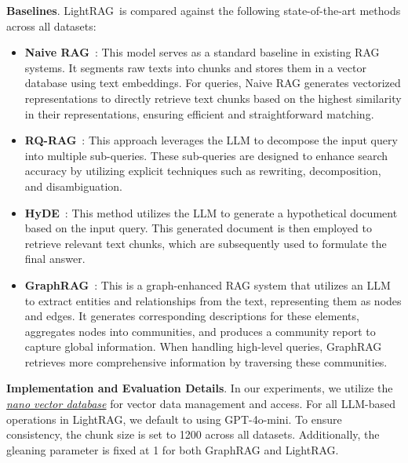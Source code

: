 \documentclass{article} %
\def\model{LightRAG}
\begin{document}
\textbf{Baselines}.  \model\ is compared against the following state-of-the-art methods across all datasets:
\begin{itemize}[leftmargin=*]
    \item \textbf{Naive RAG}~\citep{gao2023retrieval}: This model serves as a standard baseline in existing RAG systems. It segments raw texts into chunks and stores them in a vector database using text embeddings. For queries, Naive RAG generates vectorized representations to directly retrieve text chunks based on the highest similarity in their representations, ensuring efficient and straightforward matching.
    
    \item \textbf{RQ-RAG}~\citep{chan2024rq}: This approach leverages the LLM to decompose the input query into multiple sub-queries. These sub-queries are designed to enhance search accuracy by utilizing explicit techniques such as rewriting, decomposition, and disambiguation.
    
    \item \textbf{HyDE}~\citep{hyde}: This method utilizes the LLM to generate a hypothetical document based on the input query. This generated document is then employed to retrieve relevant text chunks, which are subsequently used to formulate the final answer.
    
    \item \textbf{GraphRAG}~\citep{edge2024local}: This is a graph-enhanced RAG system that utilizes an LLM to extract entities and relationships from the text, representing them as nodes and edges. It generates corresponding descriptions for these elements, aggregates nodes into communities, and produces a community report to capture global information. When handling high-level queries, GraphRAG retrieves more comprehensive information by traversing these communities.
\end{itemize}

\textbf{Implementation and Evaluation Details}.
In our experiments, we utilize the \href{https://github.com/gusye1234/nano-vectordb}{\textit{nano vector database}} for vector data management and access. For all LLM-based operations in \model, we default to using GPT-4o-mini. To ensure consistency, the chunk size is set to 1200 across all datasets. Additionally, the gleaning parameter is fixed at 1 for both GraphRAG and \model.
\end{document}

